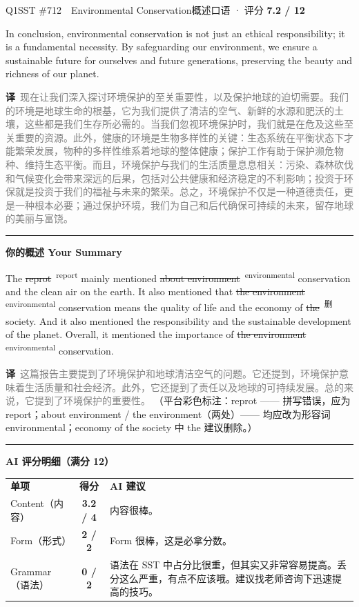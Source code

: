 \documentclass[11pt]{article}
\newcommand{\fix}[2]{%
  \colorbox{cWrongBg}{\textcolor{cWrong}{\sout{#1}}}%
  \,\textsuperscript{\textcolor{cFix}{\footnotesize #2}}}
\newcommand{\del}[1]{%
  \colorbox{cDelBg}{\textcolor{cDelete}{\sout{#1}}}%
  \,\textsuperscript{\textcolor{cDelete}{\footnotesize 删}}}
\newcommand{\sfull}[1]{\textcolor{cFix}{\bfseries #1}}     %
\newcommand{\spart}[1]{\textcolor{cPartial}{\bfseries #1}} %
\newcommand{\szero}[1]{\textcolor{cWrong}{\bfseries #1}}   %
\newcommand{\ptesub}[1]{%
  \par\needspace{2\baselineskip}\smallskip
  {\color{cAccent}\rule[-0.2ex]{3pt}{1.05em}}\hspace{6pt}%
  {\bfseries\color{cHead}#1}\par\nopagebreak\smallskip}
\newcommand{\zh}[1]{{\footnotesize\textcolor{cNote}{\textbf{译}}\ \textcolor{gray}{#1}}}
\begin{document}
\begin{qblock}{Q1\quad SST \#712\ \ Environmental Conservation}{概述口语 · 评分 \textcolor{cAccent}{\bfseries 7.2 / 12}}
\begin{promptbox}
In conclusion, environmental conservation is not just an ethical responsibility; it is a fundamental necessity. By safeguarding our environment, we ensure a sustainable future for ourselves and future generations, preserving the beauty and richness of our planet.
\end{promptbox}
\zh{现在让我们深入探讨环境保护的至关重要性，以及保护地球的迫切需要。我们的环境是地球生命的根基，它为我们提供了清洁的空气、新鲜的水源和肥沃的土壤，这些都是我们生存所必需的。当我们忽视环境保护时，我们就是在危及这些至关重要的资源。此外，健康的环境是生物多样性的关键：生态系统在平衡状态下才能繁荣发展，物种的多样性维系着地球的整体健康；保护工作有助于保护濒危物种、维持生态平衡。而且，环境保护与我们的生活质量息息相关：污染、森林砍伐和气候变化会带来深远的后果，包括对公共健康和经济稳定的不利影响；投资于环保就是投资于我们的福祉与未来的繁荣。总之，环境保护不仅是一种道德责任，更是一种根本必要；通过保护环境，我们为自己和后代确保可持续的未来，留存地球的美丽与富饶。}
\ptesub{你的概述 Your Summary}
\begin{youbox}
The \fix{reprot}{report} mainly mentioned \fix{about environment}{environmental} conservation and the clean air on the earth. It also mentioned that \fix{the environment}{environmental} conservation means the quality of life and the economy of \del{the} society. And it also mentioned the responsibility and the sustainable development of the planet. Overall, it mentioned the importance of \fix{the environment}{environmental} conservation.
\end{youbox}
\zh{这篇报告主要提到了环境保护和地球清洁空气的问题。它还提到，环境保护意味着生活质量和社会经济。此外，它还提到了责任以及地球的可持续发展。总的来说，它提到了环境保护的重要性。}
{\footnotesize\color{gray}（平台彩色标注：reprot —— 拼写错误，应为 report；about environment / the environment（两处）—— 均应改为形容词 environmental；economy of the society 中 the 建议删除。）}
\ptesub{AI 评分明细（满分 12）}
\begin{notebox}
{\renewcommand{\arraystretch}{1.35}
\begin{tabularx}{\linewidth}{@{}l c Z@{}}
\textbf{单项} & \textbf{得分} & \textbf{AI 建议}\\[2pt]
Content（内容）& \spart{3.2 / 4} & 内容很棒。\\
Form（形式）& \sfull{2 / 2} & Form 很棒，这是必拿分数。\\
Grammar（语法）& \szero{0 / 2} & 语法在 SST 中占分比很重，但其实又非常容易提高。丢分这么严重，有点不应该哦。建议找老师咨询下迅速提高的技巧。\\

\end{tabularx}}
\end{notebox}
\end{qblock}
\end{document}
